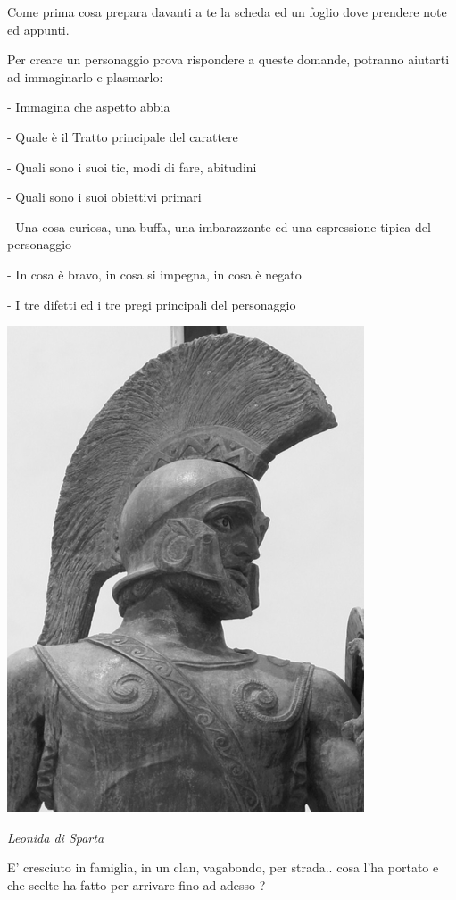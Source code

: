 \begin{multicols}{2}

Come prima cosa prepara davanti a te la scheda ed un foglio dove prendere note ed appunti.

Per creare un personaggio prova rispondere a queste domande, potranno aiutarti ad immaginarlo e plasmarlo:

- Immagina che aspetto abbia

- Quale è il Tratto principale del carattere

- Quali sono i suoi tic, modi di fare, abitudini

- Quali sono i suoi obiettivi primari

- Una cosa curiosa, una buffa, una imbarazzante ed una espressione tipica del personaggio

- In cosa è bravo, in cosa si impegna, in cosa è negato

- I tre difetti ed i tre pregi principali del personaggio

\begin{center}

 \includegraphics[width=0.7\linewidth]{immagini/Leonidas_I_of_Sparta.png}

\emph{Leonida di Sparta}
\end{center}


E' cresciuto in famiglia, in un clan, vagabondo, per strada.. cosa l'ha portato e che scelte ha fatto per arrivare fino ad adesso ?


\end{multicols}
